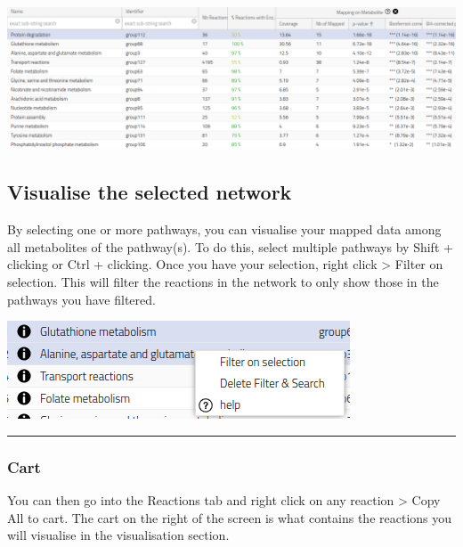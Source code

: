 \documentclass[
  24px,
  letterpaper,
  DIV=11,
  numbers=noendperiod]{scrartcl}
\begin{document}
\includegraphics{images/metexplore_top_PE.png}

\hypertarget{visualise-the-selected-network}{%
\subsection{Visualise the selected
network}\label{visualise-the-selected-network}}

By selecting one or more pathways, you can visualise your mapped data
among all metabolites of the pathway(s). To do this, select multiple
pathways by Shift + clicking or Ctrl + clicking. Once you have your
selection, right click \textgreater{} Filter on selection. This will
filter the reactions in the network to only show those in the pathways
you have filtered.

\includegraphics{images/metexplore_filter_on_selection.png}

\begin{center}\rule{0.5\linewidth}{0.5pt}\end{center}

\hypertarget{cart}{%
\subsubsection{Cart}\label{cart}}

You can then go into the Reactions tab and right click on any reaction
\textgreater{} Copy All to cart. The cart on the right of the screen is
what contains the reactions you will visualise in the visualisation
section.
\end{document}
